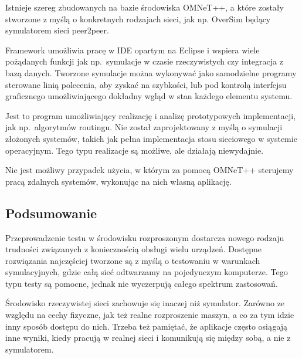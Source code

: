 \documentclass[00-praca-magisterska.tex]{subfiles}
\begin{document}

Istnieje szereg  zbudowanych na bazie środowiska OMNeT++, a które
zostały stworzone z myślą o konkretnych rodzajach sieci, jak np. OverSim będący
symulatorem sieci peer2peer.

Framework umożliwia pracę w IDE opartym na Eclipse i wspiera wiele pożądanych
funkcji jak np.~symulacje w czasie rzeczywistych czy integracja z bazą danych.
Tworzone symulacje można wykonywać jako samodzielne programy sterowane linią
polecenia, aby zyskać na szybkości, lub pod kontrolą interfejsu graficznego
umożliwiającego dokładny wgląd w stan każdego elementu systemu.

Jest to program umożliwiający realizację i analizę prototypowych implementacji,
jak np.~algorytmów routingu. Nie został zaprojektowany z myślą o symulacji
złożonych systemów, takich jak pełna implementacja stosu sieciowego w systemie
operacyjnym. Tego typu realizacje są możliwe, ale działają niewydajnie.


Nie jest możliwy przypadek użycia, w którym za pomocą OMNeT++ sterujemy pracą
zdalnych systemów, wykonując na nich własną aplikację.


\subsection{Podsumowanie}

Przeprowadzenie testu w środowisku rozproszonym dostarcza nowego rodzaju
trudności związanych z koniecznością obsługi wielu urządzeń. Dostępne
rozwiązania najczęściej tworzone są z myślą o testowaniu w warunkach
symulacyjnych, gdzie całą sieć odtwarzamy na pojedynczym komputerze. Tego typu
testy są pomocne, jednak nie wyczerpują całego spektrum zastosowań.

Środowisko rzeczywistej sieci zachowuje się inaczej niż symulator. Zarówno ze
względu na cechy fizyczne, jak też realne rozproszenie maszyn, a co za tym
idzie inny sposób dostępu do nich. Trzeba też pamiętać, że aplikacje często
osiągają inne wyniki, kiedy pracują w realnej sieci i komunikują się między
sobą, a nie z symulatorem.
\end{document}
